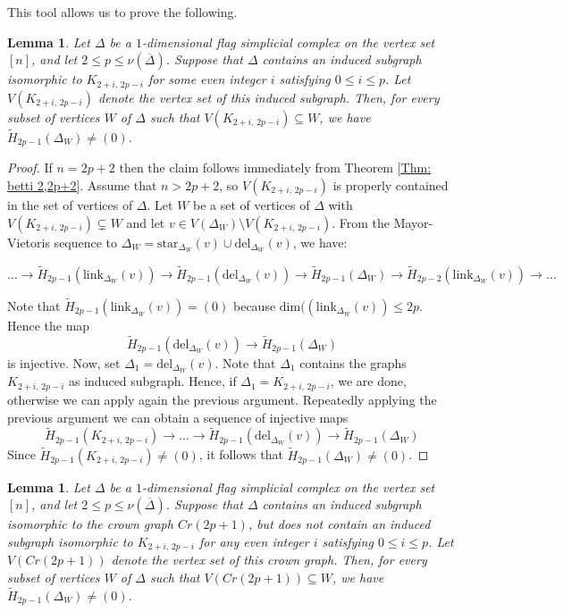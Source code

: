 \documentclass[12pt]{amsart}
\newtheorem{Lemma}[Theorem]{Lemma}
\begin{document}
This tool allows us to prove the following. 

\begin{Lemma}\label{Lemma: resol K}
Let $\Delta$ be a $1$-dimensional flag simplicial complex on the vertex set $[n]$, and let $2 \leq p \leq \nu(\overline{\Delta})$. Suppose that $\Delta$ contains an induced subgraph isomorphic to $K_{2+i,\,2p-i}$ for some even integer $i$ satisfying $0 \leq i \leq p$. Let $V(K_{2+i,\,2p-i})$ denote the vertex set of this induced subgraph. Then, for every subset of vertices $W$ of $\Delta$ such that $V(K_{2+i,\,2p-i}) \subseteq W$, we have $\widetilde{H}_{2p-1}(\Delta_W) \neq (0)$.
\end{Lemma}

\begin{proof}
If $n=2p+2$ then the claim follows immediately from Theorem \ref{Thm: betti 2,2p+2}. Assume that $n>2p+2$, so $V(K_{2+i,\,2p-i})$ is properly contained in the set of vertices of $\Delta$. Let $W$ be a set of vertices of $\Delta$ with $V(K_{2+i,\,2p-i}) \subsetneq W$ and let $v\in V(\Delta_W)\setminus V(K_{2+i,\,2p-i})$.  From the Mayor-Vietoris sequence to $\Delta_W=\text{star}_{\Delta_W}(v)\cup \text{del}_{\Delta_W}(v)$, we have:
    
\[ \dots \longrightarrow \tilde{H}_{2p-1}(\text{link}_{\Delta_W}(v)) \longrightarrow  \tilde{H}_{2p-1}(\text{del}_{\Delta_W}(v)) \longrightarrow \tilde{H}_{2p-1}(\Delta_W) \longrightarrow \tilde{H}_{2p-2}(\text{link}_{\Delta_W}(v)) \longrightarrow \dots \]

Note that $\tilde{H}_{2p-1}(\text{link}_{\Delta_W}(v))=(0)$ because $\text{dim}((\text{link}_{\Delta_W}(v))\leq 2p$. Hence the map $$\tilde{H}_{2p-1}(\text{del}_{\Delta_W}(v)) \longrightarrow \tilde{H}_{2p-1}(\Delta_W)$$ is injective. Now, set $\Delta_1= \text{del}_{\Delta_W}(v).$ Note that $\Delta_1$ contains the graphs $K_{2+i,\,2p-i}$ as induced subgraph. Hence, if $\Delta_1=K_{2+i,\,2p-i}$, we are done, otherwise we can apply again the previous argument. Repeatedly applying the previous argument we can obtain a sequence of injective maps 
$$\tilde{H}_{2p-1}(K_{2+i,\,2p-i}) \longrightarrow \dots\longrightarrow \tilde{H}_{2p-1}(\text{del}_{\Delta_W}(v)) \longrightarrow \tilde{H}_{2p-1}(\Delta_W)$$ 
Since $\tilde{H}_{2p-1}(K_{2+i,\,2p-i}) \neq (0)$, it follows that $\tilde{H}_{2p-1}(\Delta_W) \neq (0)$.
\end{proof}

\begin{Lemma}\label{Lemma: resol Crown}
Let $\Delta$ be a $1$-dimensional flag simplicial complex on the vertex set $[n]$, and let $2 \leq p \leq \nu(\overline{\Delta})$. Suppose that $\Delta$ contains an induced subgraph isomorphic to the crown graph $Cr(2p+1)$, but does not contain an induced subgraph isomorphic to $K_{2+i,\,2p-i}$ for any even integer $i$ satisfying $0 \leq i \leq p$. Let $V(Cr(2p+1))$ denote the vertex set of this crown graph. Then, for every subset of vertices $W$ of $\Delta$ such that $V(Cr(2p+1))\subseteq W$, we have $\widetilde{H}_{2p-1}(\Delta_W) \neq (0)$.
\end{Lemma} 
\end{document}
